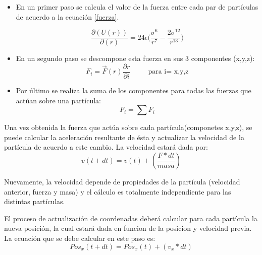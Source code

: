 \begin{itemize}
\item En un primer paso se calcula el valor de la fuerza entre cada par de partículas de acuerdo a la ecuación \ref{fuerza}.

\begin{equation} 
  \dfrac{\partial(U(r)) }{ \partial(r)}  =  24\epsilon \bigg(\dfrac{{\sigma}^{6}}{{r}^{7}} - \dfrac{2{\sigma}^{12}} {{r}^{13}}\bigg)
\end{equation}


\item En un segundo paso se descompone esta fuerza en sus 3 componentes (x,y,z): \begin{equation}                                                                                
F_i=\vec{F}(r)\dfrac{\partial r}{\partial i}  \hspace{30pt} \text{para i= x,y,z}
                                                                                 \end{equation}

\item Por último se realiza la suma de los componentes para todas las fuerzas que actúan sobre una partícula: 
\begin{equation}
F_i=\sum F_i
\end{equation}

\end{itemize}



Una vez obtenida la fuerza que actúa sobre cada partícula(componetes x,y,z), se puede calcular la aceleración resultante de ésta y actualizar la velocidad de la partícula de acuerdo a este cambio.
La velocidad estará dada por:
 \begin{equation} 
    v(t+dt)= v(t) + (\frac{F*dt}{masa})
 \end{equation}

Nuevamente, la velocidad depende de propiedades de la partícula (velocidad anterior, fuerza y masa) y el cálculo es totalmente independiente para las distintas partículas.  


El proceso de actualización de coordenadas deberá calcular para cada partícula la nueva posición, la cual estará dada en funcion de la posicion y velocidad previa. La ecuación que se debe calcular en este paso es:
\begin{equation} 
    Pos_x(t+dt)= Pos_x(t) + (v_x*dt)
\end{equation}


